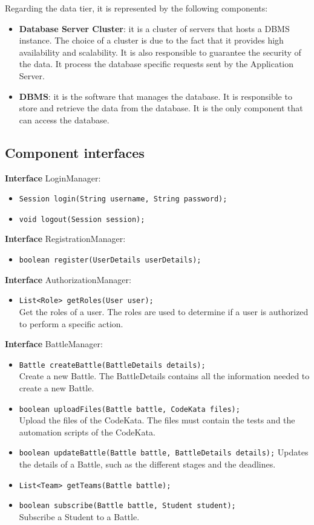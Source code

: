 Regarding the data tier, it is represented by the following components:
\begin{itemize}
    \item \textbf{Database Server Cluster}: it is a cluster of servers that hosts a DBMS instance. The choice of a cluster is due to the fact that it provides high availability and scalability. It is also responsible to guarantee the security of the data. It process the database specific requests sent by the Application Server.
    \item \textbf{DBMS}: it is the software that manages the database. It is responsible to store and retrieve the data from the database. It is the only component that can access the database.
\end{itemize}
\subsection{Component interfaces}

\textbf{Interface} LoginManager:
\begin{itemize}
    \item \texttt{Session login(String username, String password);}
    \item \texttt{void logout(Session session);}
\end{itemize}

\textbf{Interface} RegistrationManager:
\begin{itemize}
    \item \texttt{boolean register(UserDetails userDetails);}
\end{itemize}

\textbf{Interface} AuthorizationManager:
\begin{itemize}
    \item \texttt{List<Role> getRoles(User user);}
    \\ Get the roles of a user. The roles are used to determine if a user is authorized to perform a specific action.
\end{itemize}

\textbf{Interface} BattleManager:
\begin{itemize}
    \item \texttt{Battle createBattle(BattleDetails details);}
    \\ Create a new Battle. The BattleDetails contains all the information needed to create a new Battle.
    \item \texttt{boolean uploadFiles(Battle battle, CodeKata files);}
    \\ Upload the files of the CodeKata. The files must contain the tests and the automation scripts of the CodeKata.
    \item \texttt{boolean updateBattle(Battle battle, BattleDetails details);}
    Updates the details of a Battle, such as the different stages and the deadlines.
    \item \texttt{List<Team> getTeams(Battle battle);}
    \item \texttt{boolean subscribe(Battle battle, Student student);}
    \\ Subscribe a Student to a Battle.
\end{itemize}

